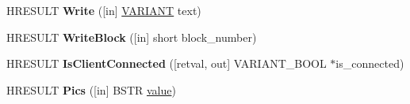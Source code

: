 \begin{DoxyCompactItemize}
H\+R\+E\+S\+U\+LT {\bfseries Write} (\mbox{[}in\mbox{]} \hyperlink{structtag_v_a_r_i_a_n_t}{V\+A\+R\+I\+A\+NT} text)
\item 
\mbox{\label{interface_i_response_a672eb5bb67ccc73eb1878c8532a01f2f}} 
H\+R\+E\+S\+U\+LT {\bfseries Write\+Block} (\mbox{[}in\mbox{]} short block\+\_\+number)
\item 
\mbox{\label{interface_i_response_a68b03365736ee1c87dc01843548e5433}} 
H\+R\+E\+S\+U\+LT {\bfseries Is\+Client\+Connected} (\mbox{[}retval, out\mbox{]} V\+A\+R\+I\+A\+N\+T\+\_\+\+B\+O\+OL $\ast$is\+\_\+connected)
\item 
\mbox{\label{interface_i_response_ae8fa1db11d057a74909c6eaae0d18139}} 
H\+R\+E\+S\+U\+LT {\bfseries Pics} (\mbox{[}in\mbox{]} B\+S\+TR \hyperlink{unionvalue}{value})
\end{DoxyCompactItemize}
